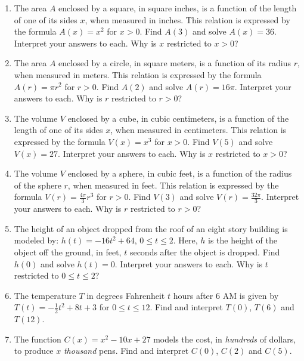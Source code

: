 \begin{enumerate}
\setcounter{enumi}{\value{HW}}

\item  The area $A$ enclosed by a square, in square inches,  is a function of the length of one of its sides $x$, when measured in inches.  This relation is expressed by the formula $A(x) = x^2$ for $x > 0$.  Find $A(3)$ and solve $A(x) = 36$.  Interpret your answers to each.  Why is $x$ restricted to $x > 0$?

\item  The area $A$ enclosed by a circle, in square meters, is a function of its radius $r$, when measured in meters.  This relation is expressed by the formula $A(r) = \pi r^2$ for $r > 0$.  Find $A(2)$ and solve $A(r) = 16\pi$.  Interpret your answers to each.  Why is $r$ restricted to $r > 0$?

\item  The volume $V$ enclosed by a cube, in cubic centimeters, is a function of the length of one of its sides $x$, when measured in centimeters.  This relation is expressed by the formula $V(x) = x^3$ for $x > 0$.  Find $V(5)$ and solve $V(x) = 27$.  Interpret your answers to each.  Why is $x$ restricted to $x > 0$?

\item  The volume $V$ enclosed by a sphere, in cubic feet, is a function of the radius of the sphere $r$, when measured in feet.  This relation is expressed by the formula $V(r) =\frac{4\pi}{3} r^{3}$ for $r > 0$.  Find $V(3)$ and solve $V(r) = \frac{32\pi}{3}$.  Interpret your answers to each.  Why is $r$ restricted to $r > 0$?


\item  The height of an object dropped from the roof of an eight story building is modeled by:  $h(t) = -16t^2 + 64$, $0 \leq t \leq 2$. Here,  $h$ is the height of the object off the ground, in feet, $t$ seconds after the object is dropped.  Find $h(0)$ and solve $h(t) = 0$.  Interpret your answers to each.  Why is $t$ restricted to $0 \leq t \leq 2$?

\item  The temperature $T$ in degrees Fahrenheit $t$ hours after 6 AM is given by $T(t) = -\frac{1}{2} t^2 + 8t+3$ for $0 \leq t \leq 12$. Find and interpret $T(0)$, $T(6)$ and $T(12)$.  

\item The function $C(x) = x^2-10x+27$  models the cost, in \textit{hundreds} of dollars, to produce $x$ \textit{thousand} pens.  Find and interpret $C(0)$, $C(2)$ and $C(5)$.


\end{enumerate}
